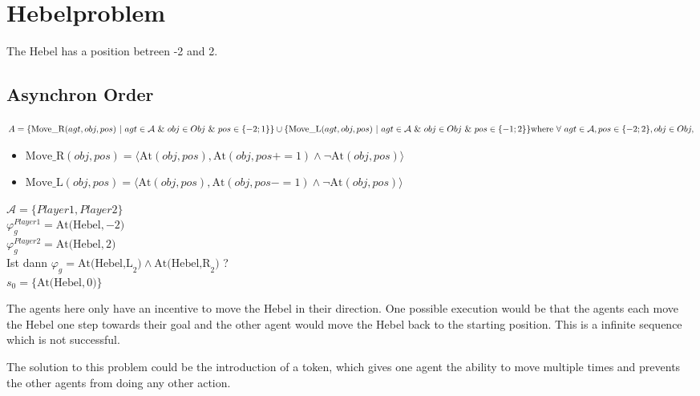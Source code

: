 \section{Hebelproblem}
The Hebel has a position betreen -2 and 2.
\newpage
\subsection{Asynchron Order}
$
A=
\{\text{Move\_R}(agt,obj,pos) \ | \ agt \in \mathcal{A} \ \& \ obj \in Obj \ \& \ pos \in \{ -2;1\}\} \cup \\
\{\text{Move\_L}(agt,obj,pos) \ | \ agt \in \mathcal{A} \ \& \ obj \in Obj \ \& \ pos \in \{ -1;2\}\} \\
\text{where} \ \forall \ agt \in \mathcal{A}, pos \in \{ -2;2\}, obj \in Obj ,
$
\begin{itemize}
  \item $
    \text{Move\_R}(obj,pos) = \langle \text{At}(obj, pos) , \text{At}(obj, pos+=1) \wedge \neg \text{At}(obj,pos) \rangle
    $
  \item $
    \text{Move\_L}(obj,pos) = \langle \text{At}(obj, pos) , \text{At}(obj, pos-=1) \wedge \neg \text{At}(obj,pos) \rangle
    $
\end{itemize}
$\mathcal{A}= \{Player1, Player2\}$ \\
$\varphi^{Player1}_g = \text{At(Hebel},-2)$  \\
$\varphi^{Player2}_g = \text{At(Hebel},2)$ \\
Ist dann $\varphi_g = \text{At(Hebel,L}_2) \wedge \text{At(Hebel,R}_2)$ ? \\
$s_0 = \{\text{At(Hebel}, 0) \}$


The agents here only have an incentive to move the Hebel in their direction. One possible execution would be that the agents each move the Hebel one step towards their goal and the other agent would move the Hebel back to the starting position. This is a infinite sequence which is not successful.

The solution to this problem could be the introduction of a token, which gives one agent the ability to move multiple times and prevents the other agents from doing any other action.

\newpage


